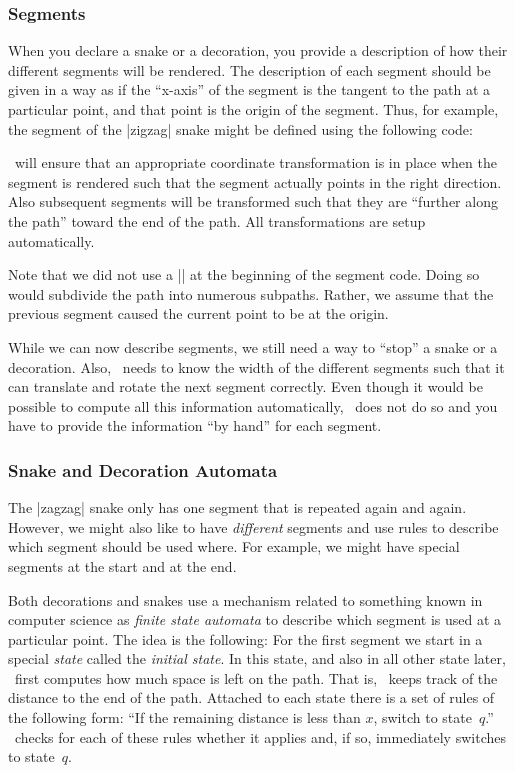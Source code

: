 \subsubsection{Segments}


When you declare a snake or a decoration, you provide a description 
of how their different segments will be rendered. The description of
each segment should be given in a way as if the ``x-axis'' of the
segment is the tangent to the path at a particular point,
and that point is the origin of the segment.
Thus, for example, the segment of the |zigzag| snake might be
defined using the following code: 
\begin{codeexample}
\pgfpathlineto{\pgfpoint{5pt}{5pt}}
\pgfpathlineto{\pgfpoint{15pt}{-5pt}}
\pgfpathlineto{\pgfpoint{20pt}{0pt}}
\end{codeexample}

\pgfname\ will ensure that an appropriate coordinate transformation
is in place when the segment is rendered such that
the segment actually points in the right direction. Also
subsequent segments will be transformed such that they are
``further along the path'' toward the end of the path.
All transformations are setup automatically.

Note that we did not use a |\pgfpathmoveto{\pgfpointorigin}| at the
beginning of the segment code. Doing so would subdivide the path into
numerous subpaths. Rather, we assume that the previous segment caused
the current point to be at the origin.

While we can now describe segments, we still need a way to ``stop''
a snake or a decoration. Also, \pgfname\ needs to know the width of 
the different segments such that it can translate and rotate the 
next segment correctly.
Even though it would be possible to compute all this information
automatically, \pgfname\ does not do so and you have to provide the
information ``by hand'' for each segment. 


\subsubsection{Snake and Decoration Automata}

The |zagzag| snake only has one segment that is repeated again and
again. However, we might also like to have \emph{different} segments
and use rules to describe which segment should be used where. For
example, we might have special segments at the start and at the end.

Both decorations and snakes use a mechanism related to something known
in computer science as \emph{finite state automata} to describe which
segment is used at a particular point. The idea is the following: For
the first segment we 
start in a special \emph{state} called the \emph{initial state}. In
this state, and also in all other state later, \pgfname\ first
computes how much space is left on the path. That is, \pgfname\ keeps
track of the distance to the end of the path. Attached to each state 
there is a set of rules of the following form: ``If the remaining 
distance is less than $x$, switch to state~$q$.'' \pgfname\ checks 
for each of these rules whether it applies and, if so, immediately 
switches to state~$q$.


